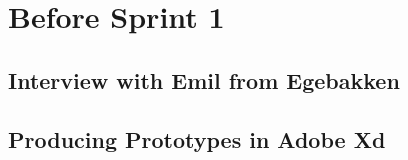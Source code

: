 \section{Before Sprint 1}

\subsection{Interview with Emil from Egebakken}

\subsection{Producing Prototypes in Adobe Xd}
